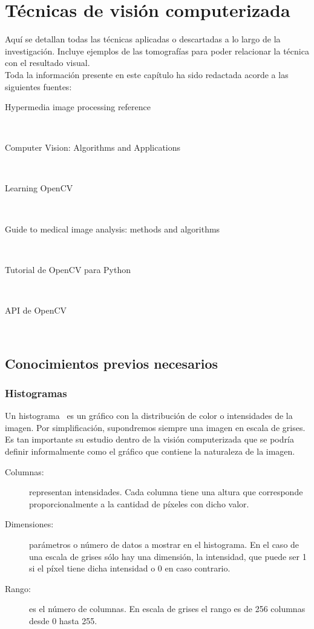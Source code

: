 \chapter{Técnicas de visión computerizada}
Aquí se detallan todas las técnicas aplicadas o descartadas a lo largo
de la investigación. Incluye ejemplos de las tomografías para poder
relacionar la técnica con el resultado visual.\\
Toda la información presente en este capítulo ha sido redactada acorde
a las siguientes fuentes:
\begin{description}
\item[Hypermedia image processing
  reference]~\emph{\citep*{fisher1996hypermedia}}
\item[Computer Vision: Algorithms and
  Applications]~\emph{\citep*{szeliski2010computer}}
\item[Learning OpenCV]~\emph{\citep*{opencv_book-bib}}
\item[Guide to medical image analysis: methods and
  algorithms]~\emph{\citep*{toennies2012guide}}
\item[Tutorial de OpenCV para
  Python]~\emph{\citep*{opencv_tutorial-bib}}
\item[API de OpenCV]~\emph{\citep*{opencv_api-bib}}
\end{description}

\section{Conocimientos previos necesarios}

\subsection{Histogramas}\label{tecnica:histogramas}
Un histograma~\emph{\citep*[Chapter 7. Histograms and
  Matching]{opencv_book-bib}} es un gráfico con la distribución de
color o intensidades de la imagen. Por simplificación, supondremos
siempre una imagen en escala de grises. Es tan importante su estudio
dentro de la visión computerizada que se podría definir informalmente
como el gráfico que contiene la naturaleza de la imagen.
\begin{description}
\item[Columnas:] representan intensidades. Cada columna tiene una
  altura que corresponde proporcionalmente a la cantidad de píxeles
  con dicho valor.
\item[Dimensiones:] parámetros o número de datos a mostrar en el
  histograma. En el caso de una escala de grises sólo hay una
  dimensión, la intensidad, que puede ser 1 si el píxel tiene dicha
  intensidad o 0 en caso contrario.
\item[Rango:] es el número de columnas. En escala de grises el rango
  es de 256 columnas desde 0 hasta 255.
\end{description}

